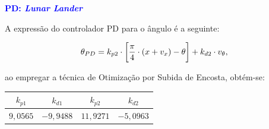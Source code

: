 \documentclass[aspectratio=169]{beamer}
\begin{document}
\begin{frame}{\textcolor{blue}{\textbf{PD: \textit{Lunar Lander}}}}
\vspace{-1.5cm}

\justifying A expressão do controlador PD para o ângulo é a seguinte:

\begin{equation}
    \theta_{PD} = k_{p2}\cdot \bigg{[} \frac{\pi}{4}\cdot (x+v_x)-\theta\bigg{]}+k_{d2}\cdot v_{\theta},
    \label{eq:tpd}
\end{equation}

\noindent \justifying ao empregar a técnica de Otimização por Subida de Encosta, obtém-se:


\begin{table}[H]
	\centering
	\vspace*{.05cm}
	\begin{tabular}{cccc}
            \rowcolor{blue!30} $k_{p1}$ & $k_{d1}$ & $k_{p2}$ & $k_{d2}$ \\
            \hline
            $9,0565$ & $-9,9488$ & $11,9271$ & $-5,0963$\\ 
            \hline
	\end{tabular}  
    \label{tab:intcartpole}                 %
\end{table}

\end{frame}

\end{document}
